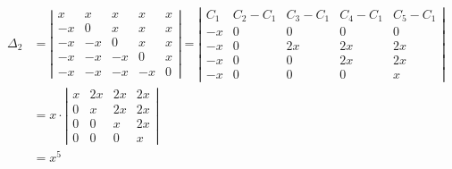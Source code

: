 {$$\begin{aligned}
\end{aligned}
$$
$$
\begin{aligned}
	\Delta_2 & =\left|\begin{array}{ccccc}
		x & x & x & x & x \\
		-x & 0 & x & x & x \\
		-x & -x & 0 & x & x \\
		-x & -x & -x & 0 & x \\
		-x & -x & -x & -x & 0
	\end{array}\right|=\left|\begin{array}{ccccc}
		C_1 & C_2-C_1 & C_3-C_1 & C_4-C_1 & C_5-C_1 \\
		-x & 0 & 0 & 0 & 0 \\
		-x & 0 & 2 x & 2 x & 2 x \\
		-x & 0 & 0 & 2 x & 2 x \\
		-x & 0 & 0 & 0 & x
	\end{array}\right| \\
	& =x \cdot\left|\begin{array}{cccc}
		x & 2 x & 2 x & 2 x \\
		0 & x & 2 x & 2 x \\
		0 & 0 & x & 2 x \\
		0 & 0 & 0 & x
	\end{array}\right| \\
	& =x^5
\end{aligned}
$$
 }